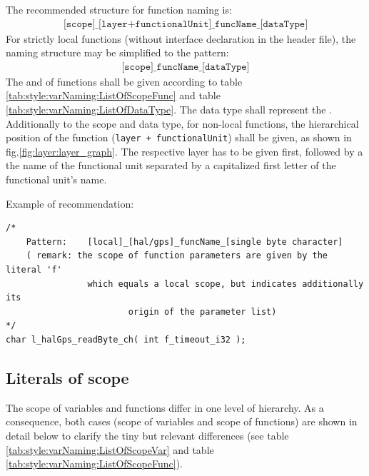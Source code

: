 The recommended structure for function naming is:
\begin{align}
\texttt{[scope]\_[layer+functionalUnit]\_funcName\_[dataType]}
\label{eqn:style:namingStructure}
\end{align}
For strictly local functions (without interface declaration in the header file), the naming structure may be simplified to the pattern:
\begin{align}
\texttt{[scope]\_funcName\_[dataType]}
\label{eqn:style:namingStructure}
\end{align}
The  and  of functions shall be given according to table \ref{tab:style:varNaming:ListOfScopeFunc} and table \ref{tab:style:varNaming:ListOfDataType}. The data type shall represent the .\\
Additionally to the scope and data type, for non-local functions, the hierarchical position of the function (\texttt{layer + functionalUnit}) shall be given, as shown in fig.\ref{fig:layer:layer_graph}. The respective layer has to be given first, followed by a the name of the functional unit separated by a capitalized first letter of the functional unit's name.

Example of recommendation:
\begin{lstlisting}
/* 
	Pattern: 	[local]_[hal/gps]_funcName_[single byte character]
	( remark: the scope of function parameters are given by the literal 'f' 
		        which equals a local scope, but indicates additionally its 
						origin of the parameter list)
*/
char l_halGps_readByte_ch( int f_timeout_i32 );
\end{lstlisting}


\subsection{Literals of scope}
The scope of variables and functions differ in one level of hierarchy. As a consequence, both cases (scope of variables and scope of functions) are shown in detail below to clarify the tiny but relevant differences (see table \ref{tab:style:varNaming:ListOfScopeVar} and table \ref{tab:style:varNaming:ListOfScopeFunc}).

